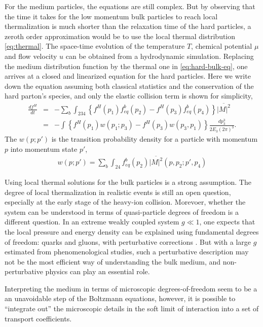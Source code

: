 For the medium particles, the equations are still complex.
But by observing that the time it takes for the low momentum bulk particles to reach local thermalization is much shorter than the relaxation time of the hard particles, a zeroth order approximation would be to use the local thermal distribution \ref{eq:thermal}.
The space-time evolution of the temperature $T$, chemical potential $\mu$ and flow velocity $u$ can be obtained from a hydrodynamic simulation.
Replacing the medium distribution function by the thermal one in \ref{eq:hard-bulk-eq}, one arrives at a closed and linearized equation for the hard particles.
Here we write down the equation assuming both classical statistics and the conservation of the hard parton's species, and only the elastic collision term is shown for simplicity,
\begin{eqnarray}
\frac{df^H}{dt} &=& -\sum_{b} \int_{234} \left\{
f^H(p_1)f^b_{eq}(p_2) - f^H(p_3)f^b_{eq}(p_4)\right\}
\overline{|M|^2} \\
&=& - \int \left\{
f^H(p_1) w(p_1; p_3) - f^H(p_3) w(p_3, p_1)\right\}\frac{dp_3^3}{2E_3 (2\pi)^3}.
\end{eqnarray}
The $w(p; p')$ is the transition probability density for a particle with momentum $p$ into momentum state $p'$,
\begin{eqnarray}
w(p; p') = \sum_b\int_{24} f_{eq}^b(p_2) \overline{|M|^2}(p, p_2; p', p_4)
\end{eqnarray}

Using local thermal solutions for the bulk particles is a strong assumption. 
The degree of local thermalization in realistic events is still an open question, especially at the early stage of the heavy-ion collision. 
Morevoer, whether the system can be understood in terms of quasi-particle degrees of freedom is a different question.
In an extreme weakly coupled system $g\ll 1$, one expects that the local pressure and energy density can be explained using fundamental degrees of freedom: quarks and gluons, with perturbative corrections \cite{Blaizot:2000fc,Strickland:2010tm,Su:2015esa,}.
But with a large $g$ estimated from phenomenological studies, such a perturbative description may not be the most efficient way of understanding the bulk medium, and non-perturbative physics can play an essential role. 

Interpreting the medium in terms of microscopic degrees-of-freedom seem to be a an unavoidable step of the Boltzmann equations, however, it is possible to ``integrate out'' the microscopic details in the soft limit of interaction into a set of transport coefficients.

